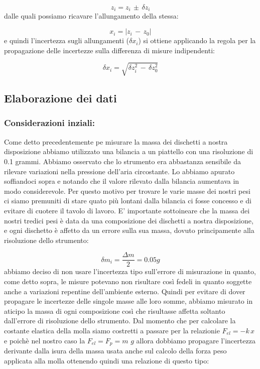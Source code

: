 \begin{equation*}
	z_i = z_i\,\pm\,\delta z_i 
\end{equation*}
dalle quali possiamo ricavare l'allungamento della stessa:

\begin{equation*}
	x_i = |z_i\,-\,z_0|
\end{equation*}
e quindi l’incertezza sugli allungamenti ($\delta x_i$) si ottiene applicando la regola per la propagazione delle incertezze sulla differenza di misure indipendenti:

\begin{equation*}
	\delta x_i = \sqrt{\delta z_i^2\,-\,\delta z_0^2}
\end{equation*}

\subsection{Elaborazione dei dati}

\subsubsection{Considerazioni inziali:}
Come detto precedentemente pe misurare la massa dei dischetti a nostra disposizione abbiamo utilizzato una bilancia a un piattello con una risoluzione di 0.1 grammi. Abbiamo osservato che lo strumento era abbastanza sensibile da rilevare variazioni nella pressione dell'aria circostante. Lo abbiamo apurato soffiandoci sopra e notando che il valore rilevato dalla bilancia aumentava in modo considerevole. Per questo motivo per trovare le varie masse dei nostri pesi ci siamo premuniti di stare quato più lontani dalla bilancia ci fosse concesso e di evitare di cuotere il tavolo di lavoro.
E' importante sottoineare che la massa dei nostri tredici pesi è data da una composizione dei dischetti a nostra disposizione, e ogni dischetto è affetto da un errore sulla sua massa, dovuto principamente alla risoluzione dello strumento:

\begin{equation*}
	\delta m_i = \frac{\Delta m}{2} = 0.05 g 
\end{equation*}
abbiamo deciso di non usare l'incertezza tipo sull'errore di misurazione in quanto, come detto sopra, le misure potevano non risultare così fedeli in quanto soggette anche a variazioni repentine dell'ambiente esterno.
Quindi per evitare di dover propagare le incertezze delle singole masse alle loro somme, abbiamo misurato in aticipo la massa di ogni composizione così che risultasse affetta soltanto dall'errore di risoluzione dello strumento.
Dal momento che per calcolare la costante elastica della molla siamo costretti a passare per la relazionie $F_{el} = -k\,x$ e poichè nel nostro caso la $F_{el} = F_{p} = m\,\,g$ allora dobbiamo propagare l'incertezza derivante dalla isura della massa usata anche sul calcolo della forza peso applicata alla molla ottenendo quindi una relazione di questo tipo:

